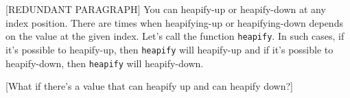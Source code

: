 [REDUNDANT PARAGRAPH]
You can heapify-up or heapify-down at any index position.
There are times when heapifying-up or heapifying-down depends on the
value at the given index.
Let's call the function \verb!heapify!.
In such cases, if it's possible to heapify-up, then \verb!heapify! will
heapify-up and if it's possible to heapify-down, then \verb!heapify!
will heapify-down.

[What if there's a value that can heapify up and can heapify down?]



